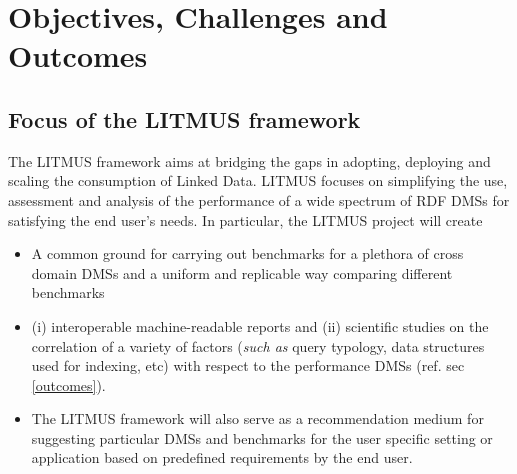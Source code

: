 \documentclass{llncs}
\begin{document}
    
    

\section{Objectives, Challenges and Outcomes}\label{Objectives}
    \subsection{Focus of the LITMUS framework}
        The LITMUS framework aims at bridging the gaps in adopting, deploying and scaling the consumption of Linked Data. LITMUS focuses on simplifying the use, assessment and analysis of the performance of a wide spectrum of RDF DMSs for satisfying the end user's needs. In particular, the LITMUS project will create    \begin{itemize}[nosep]
            \item {} A common ground for carrying out benchmarks for a plethora of cross domain DMSs and a uniform and replicable way comparing different benchmarks
            \item {} (i) interoperable machine-readable reports and (ii) scientific studies on the correlation of a variety of factors (\textit{such as} query typology, data structures used for indexing, etc) with respect to the performance DMSs (ref. sec \ref{outcomes}). 
            \item {} The LITMUS framework will also serve as a recommendation medium for suggesting particular DMSs and benchmarks for the user specific setting or application based on predefined requirements by the end user.  
        \end{itemize}  
\end{document}

